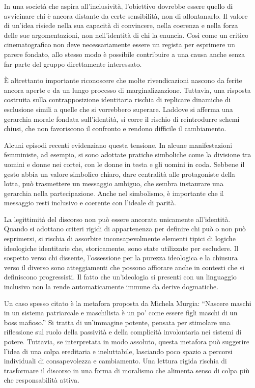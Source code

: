 \documentclass[12pt]{book} %
\begin{document}
In una società che aspira all’inclusività, l’obiettivo dovrebbe essere quello di avvicinare chi è ancora distante da certe sensibilità, non di allontanarlo. Il valore di un’idea risiede nella sua capacità di convincere, nella coerenza e nella forza delle sue argomentazioni, non nell’identità di chi la enuncia. Così come un critico cinematografico non deve necessariamente essere un regista per esprimere un parere fondato, allo stesso modo è possibile contribuire a una causa anche senza far parte del gruppo direttamente interessato.

È altrettanto importante riconoscere che molte rivendicazioni nascono da ferite ancora aperte e da un lungo processo di marginalizzazione. Tuttavia, una risposta costruita sulla contrapposizione identitaria rischia di replicare dinamiche di esclusione simili a quelle che si vorrebbero superare. Laddove si afferma una gerarchia morale fondata sull’identità, si corre il rischio di reintrodurre schemi chiusi, che non favoriscono il confronto e rendono difficile il cambiamento.

Alcuni episodi recenti evidenziano questa tensione. In alcune manifestazioni femministe, ad esempio, si sono adottate pratiche simboliche come la divisione tra uomini e donne nei cortei, con le donne in testa e gli uomini in coda. Sebbene il gesto abbia un valore simbolico chiaro, dare centralità alle protagoniste della lotta, può trasmettere un messaggio ambiguo, che sembra instaurare una gerarchia nella partecipazione. Anche nel simbolismo, è importante che il messaggio resti inclusivo e coerente con l’ideale di parità.

La legittimità del discorso non può essere ancorata unicamente all’identità. Quando si adottano criteri rigidi di appartenenza per definire chi può o non può esprimersi, si rischia di assorbire inconsapevolmente elementi tipici di logiche ideologiche identitarie che, storicamente, sono state utilizzate per escludere. Il sospetto verso chi dissente, l’ossessione per la purezza ideologica e la chiusura verso il diverso sono atteggiamenti che possono affiorare anche in contesti che si definiscono progressisti. Il fatto che un’ideologia si presenti con un linguaggio inclusivo non la rende automaticamente immune da derive dogmatiche.

Un caso spesso citato è la metafora proposta da Michela Murgia: “Nascere maschi in un sistema patriarcale e maschilista è un po' come essere figli maschi di un boss mafioso.” Si tratta di un’immagine potente, pensata per stimolare una riflessione sul ruolo della passività e della complicità involontaria nei sistemi di potere. Tuttavia, se interpretata in modo assoluto, questa metafora può suggerire l’idea di una colpa ereditaria e ineluttabile, lasciando poco spazio a percorsi individuali di consapevolezza e cambiamento. Una lettura rigida rischia di trasformare il discorso in una forma di moralismo che alimenta senso di colpa più che responsabilità attiva.
\end{document}
